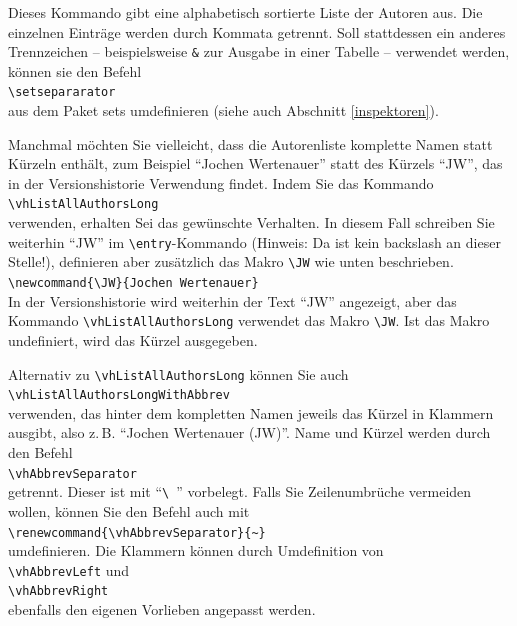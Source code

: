 Dieses Kommando gibt eine alphabetisch sortierte Liste der Autoren aus. Die einzelnen Einträge werden durch Kommata getrennt. Soll stattdessen ein anderes Trennzeichen -- beispielsweise \texttt{\&} zur Ausgabe in einer Tabelle -- verwendet werden, können sie den Befehl\\
\mbox{}\hspace{2em}\verb|\setsepararator|\\
aus dem Paket sets umdefinieren (siehe auch Abschnitt \ref{inspektoren}).

Manchmal möchten Sie vielleicht, dass die Autorenliste komplette Namen statt Kürzeln enthält, zum Beispiel
"`Jochen Wer\-ten\-au\-er"' statt des Kürzels "`JW"', das in der Versionshistorie Verwendung findet. Indem Sie das Kommando\\
\mbox{}\hspace{2em}\verb|\vhListAllAuthorsLong|\\
verwenden, erhalten Sei das gewünschte Verhalten. In diesem Fall schreiben Sie weiterhin ``JW'' im \verb|\entry|-Kommando (Hinweis: Da ist kein backslash an dieser Stelle!), definieren aber zusätzlich das Makro \verb|\JW| wie unten beschrieben.\\
\mbox{}\hspace{2em}\verb|\newcommand{\JW}{Jochen Wertenauer}|\\
In der Versionshistorie wird weiterhin der Text "`JW"' angezeigt, aber das Kommando \verb|\vhListAllAuthorsLong| verwendet das Makro \verb|\JW|. Ist das Makro undefiniert, wird das Kürzel ausgegeben.

Alternativ zu \verb|\vhListAllAuthorsLong| können Sie auch\\
\mbox{}\hspace{2em}\verb|\vhListAllAuthorsLongWithAbbrev|\\
verwenden, das hinter dem kompletten Namen jeweils das Kürzel in Klammern ausgibt, also z.\,B. "`Jochen Wertenauer (JW)"'. Name und Kürzel werden durch den Befehl\\
\mbox{}\hspace{2em}\verb|\vhAbbrevSeparator|\\
getrennt. Dieser ist mit "`\verb*|\ |"' vorbelegt. Falls Sie Zeilenumbrüche vermeiden wollen, können Sie den Befehl auch mit\\
\mbox{}\hspace{2em}\verb|\renewcommand{\vhAbbrevSeparator}{~}|\\
umdefinieren. Die Klammern können durch Umdefinition von\\
\mbox{}\hspace{2em}\verb|\vhAbbrevLeft| und\\
\mbox{}\hspace{2em}\verb|\vhAbbrevRight|\\
ebenfalls den eigenen Vorlieben angepasst werden.

